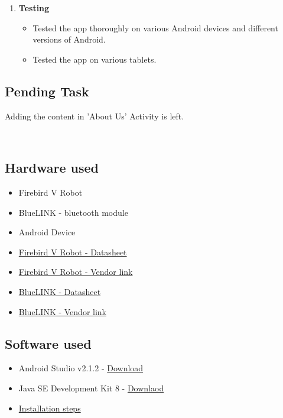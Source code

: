 \documentclass[a4paper,12pt,oneside]{book}
\begin{document}
\begin{enumerate}
\begin{itemize}
\begin{figure}[h]
\begin{center}
					\end{center}
				\end{figure}
		\end{itemize}	
		 \newpage
		\item \textbf{\large Testing} 
		    \begin{itemize}
			    \item Tested the app thoroughly on various Android devices and different versions of Android.
			    \item Tested the app on various tablets.
		    \end{itemize}
	\end{enumerate}
	\subsection*{Pending Task}
	    Adding the content in 'About Us' Activity is left.
	
		\\
    \subsection*{Hardware used}
		\begin{itemize}
		    \item Firebird V Robot 
            \item BlueLINK - bluetooth module
            \item Android Device
            \item 
            \href{./datasheet/AtMega2560.pdf}{Firebird V Robot - Datasheet}
            \item
            \href{http://www.nex-robotics.com/products/fire-bird-v-robots/fire-bird-v-atmega2560-robotic-research-platform.html}{Firebird V Robot - Vendor link}
            \item 
            \href{./datasheet/BlueLINK_External_Commands.pdf}{BlueLINK - Datasheet}
            \item 
            \href{https://www.rhydolabz.com/wiki/?tag=bluelink}{BlueLINK - Vendor link}
        \end{itemize}
        
    \subsection*{Software used}
        \begin{itemize}
            \item Android Studio v2.1.2  - 
             \href{https://developer.android.com/studio/index.html}{Download}
             \item Java SE Development Kit 8 - 
             \href{http://www.oracle.com/technetwork/java/javase/downloads/jdk8-downloads-2133151.html}{Downlaod}
            \item 
            \href {https://developer.android.com/studio/install.html}{Installation steps}
        \end{itemize}
\end{document}
